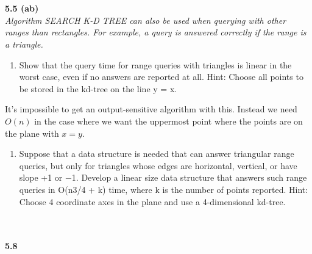 \\\\
\noindent
\textbf{5.5 (ab)}\\
\noindent
\textit{Algorithm SEARCH K-D TREE can also be used when querying with other ranges than rectangles. For example, a query is answered correctly if the range is a triangle.}

\begin{enumerate}
	\item Show that the query time for range queries with triangles is linear in the worst case, even if no answers are reported at all. Hint: Choose all points to be stored in the kd-tree on the line y = x.
\end{enumerate}
It's impossible to get an output-sensitive algorithm with this. Instead we need $O(n)$ in the case where we want the uppermost point where the points are on the plane with $x=y$.
\begin{enumerate}
	\item Suppose that a data structure is needed that can answer triangular range queries, but only for triangles whose edges are horizontal, vertical, or have slope +1 or −1. Develop a linear size data structure that answers such range queries in O(n3/4 + k) time, where k is the number of points reported. Hint: Choose 4 coordinate axes in the plane and use a 4-dimensional kd-tree.
\end{enumerate}
\\\\
\noindent
\textbf{5.8}\\
\noindent
